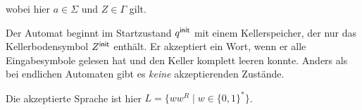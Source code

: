 {\begin{Bsp}
\begin{center}
\end{center}
wobei hier $a \in \Sigma$ und $Z \in \Gamma$ gilt.

Der Automat beginnt im Startzustand $q^\mathsf{init}$ mit einem Kellerspeicher, der nur das Kellerbodensymbol $Z^\mathsf{init}$ enthält.
Er akzeptiert ein Wort, wenn er alle Eingabesymbole gelesen hat und den Keller komplett leeren konnte.
Anders als bei endlichen Automaten gibt es \emph{keine} akzeptierenden Zustände.

Die akzeptierte Sprache ist hier $L=\{ww^R \mid w\in\{0,1\}^*\}$.
\end{Bsp}
}


